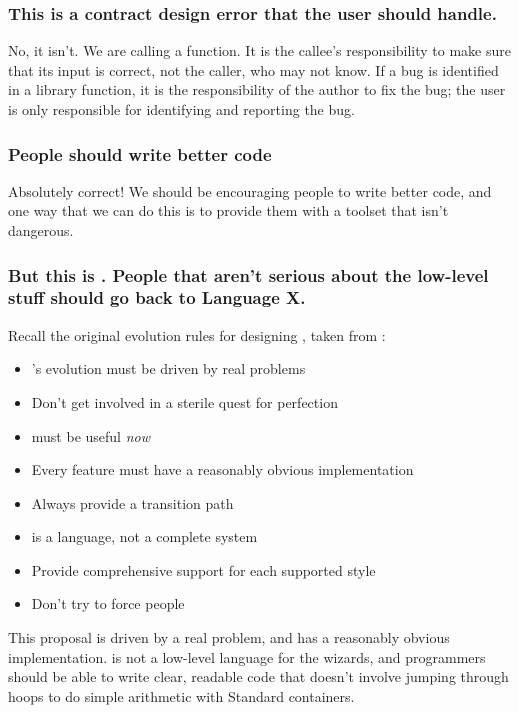\subsubsection*{This is a contract design error that the user should handle.}
No, it isn't. We are calling a function. It is the callee's responsibility to make sure that its
input is correct, not the caller, who may not know. If a bug is identified in a library function, it
is the responsibility of the author to fix the bug; the user is only responsible for identifying and
reporting the bug.

\subsubsection*{People should write better code}
Absolutely correct! We should be encouraging people to write better code, and one way that we can do
this is to provide them with a toolset that isn't dangerous.

\subsubsection*{But this is \Cpp. People that aren't serious about the low-level stuff should go
back to Language X.}
Recall the original evolution rules for designing \Cpp, taken from \cite{stroustrup94}:
\begin{itemize}
   \item \Cpp's evolution must be driven by real problems
   \item Don't get involved in a sterile quest for perfection
   \item \Cpp must be useful \textit{now}
   \item Every feature must have a reasonably obvious implementation
   \item Always provide a transition path
   \item \Cpp is a language, not a complete system
   \item Provide comprehensive support for each supported style
   \item Don't try to force people
\end{itemize}

This proposal is driven by a real problem, and has a reasonably obvious implementation. \Cpp is not
a low-level language for the wizards, and programmers should be able to write clear, readable code
that doesn't involve jumping through hoops to do simple arithmetic with Standard containers.

